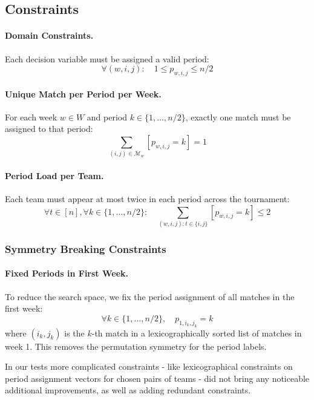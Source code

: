 \subsection{Constraints}

\paragraph{Domain Constraints.}
Each decision variable must be assigned a valid period:
\[
\forall (w,i,j): \quad 1 \leq p_{w,i,j} \leq n/2
\]

\paragraph{Unique Match per Period per Week.}
For each week $w \in W$ and period $k \in \{1, \dots, n/2\}$, exactly one match must be assigned to that period:
\[
\sum_{(i,j) \in \mathcal{M}_w} [p_{w,i,j} = k] = 1
\]

\paragraph{Period Load per Team.}
Each team must appear at most twice in each period across the tournament:
\[
\forall t \in [n], \forall k \in \{1, \dots, n/2\}: \quad \sum_{(w,i,j) : t \in \{i,j\}} [p_{w,i,j} = k] \leq 2
\]

\subsubsection*{Symmetry Breaking Constraints}

\paragraph{Fixed Periods in First Week.}
To reduce the search space, we fix the period assignment of all matches in the first week:
\[
\forall k \in \{1, \dots, n/2\},\quad p_{1,i_k,j_k} = k
\]
where $(i_k, j_k)$ is the $k$-th match in a lexicographically sorted list of matches in week 1. This removes the permutation symmetry for the period labels.

In our tests more complicated constraints - like lexicographical constraints on period assignment vectors for chosen pairs of teams - did not bring any noticeable additional improvements, as well as adding redundant constraints. 


